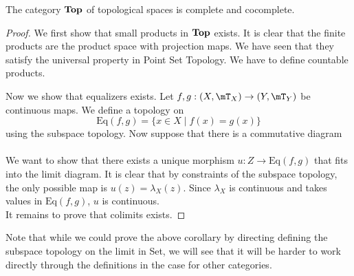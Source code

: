 \documentclass[a4paper]{article}
\begin{document}
\begin{crl}{}{} The category $\bold{Top}$ of topological spaces is complete and cocomplete. 
\begin{proof}
We first show that small products in $\bold{Top}$ exists. It is clear that the finite products are the product space with projection maps. We have seen that they satisfy the universal property in Point Set Topology. We have to define countable products. 

Now we show that equalizers exists. Let $f,g:(X,\mT_X)\to(Y,\mT_Y)$ be continuous maps. We define a topology on $$\text{Eq}(f,g)=\{x\in X\;|\;f(x)=g(x)\}$$ using the subspace topology. Now suppose that there is a commutative diagram \\
 \\
We want to show that there exists a unique morphism $u:Z\to\text{Eq}(f,g)$ that fits into the limit diagram. It is clear that by constraints of the subspace topology, the only possible map is $u(z)=\lambda_X(z)$. Since $\lambda_X$ is continuous and takes values in $\text{Eq}(f,g)$, $u$ is continuous. \\

It remains to prove that colimits exists. 
\end{proof}
\end{crl}

Note that while we could prove the above corollary by directing defining the subspace topology on the limit in Set, we will see that it will be harder to work directly through the definitions in the case for other categories. 
\end{document}
